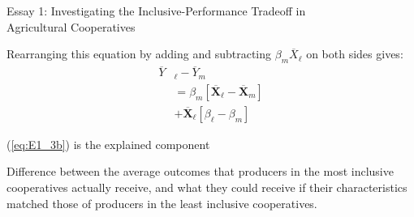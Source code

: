 \documentclass[aspectratio=169]{beamer}
\newenvironment{wideitemize}{\itemize\addtolength{\itemsep}{10pt}}{\enditemize}
\begin{document}
\begin{frame}{Essay 1: Investigating the Inclusive-Performance Tradeoff in \\ \hspace{1.7cm} Agricultural Cooperatives}
    \begin{wideitemize}
        \item Rearranging this equation by adding and subtracting $\beta_{m}\overline{X}_{\ell}$ on both sides gives: \vspace{.25cm}
            \begin{subequations}
                \begin{align}
                \overline{Y}&_{\ell} - \overline{Y}_{m} \label{eq:E1_3a} \\
                &= \beta_{m}[\overline{\mathbf{X}}_{\ell} - \overline{\mathbf{X}}_{m}] \label{eq:E1_3b} \\
                &+ \overline{\mathbf{X}}_{\ell}[\beta_{\ell} - \beta_{m}] \label{eq:E1_3c}
                \end{align}
            \end{subequations}  
        \item (\ref{eq:E1_3b}) is the explained component \vspace{.25cm}
            \begin{wideitemize}
                \item Difference between the average outcomes that producers in the most inclusive cooperatives actually receive, and what they could receive if their characteristics matched those of producers in the least inclusive cooperatives.
            \end{wideitemize}
    \end{wideitemize}    
\end{frame}
\end{document}
